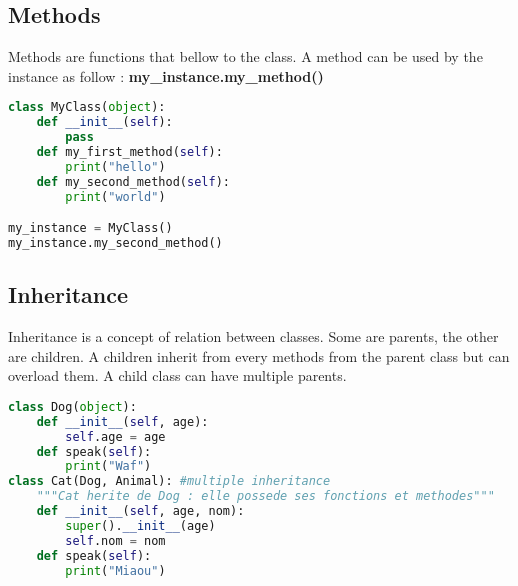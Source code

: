 \documentclass[a4paper, 12pt]{article}
\begin{document}
\subsection{Methods}
Methods are functions that bellow to the class. A method can be used by the instance as follow  : \textbf{my\_instance.my\_method()}
\begin{lstlisting}[language=Python]
class MyClass(object):
	def __init__(self):
		pass
	def my_first_method(self):
	    print("hello")
	def my_second_method(self):
	    print("world")

my_instance = MyClass()
my_instance.my_second_method()
\end{lstlisting}

\subsection{Inheritance}
Inheritance is a concept of relation between classes. Some are parents, the other are children. A children inherit from every methods from the parent class but can overload them. A child class can have multiple parents.
\begin{lstlisting}[language=Python]
class Dog(object):
	def __init__(self, age):
		self.age = age
	def speak(self):
		print("Waf")
class Cat(Dog, Animal): #multiple inheritance
	"""Cat herite de Dog : elle possede ses fonctions et methodes"""
	def __init__(self, age, nom):
		super().__init__(age)
		self.nom = nom
	def speak(self):
		print("Miaou")
\end{lstlisting}
\end{document}
